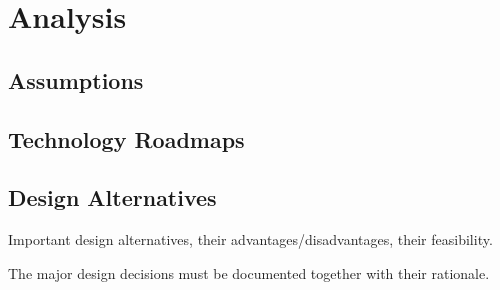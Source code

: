 \chapter{Analysis}

\section{Assumptions}

\section{Technology Roadmaps}

\section{Design Alternatives}

Important design alternatives, their advantages/disadvantages, their feasibility.

The major design decisions must be documented together with their rationale.
